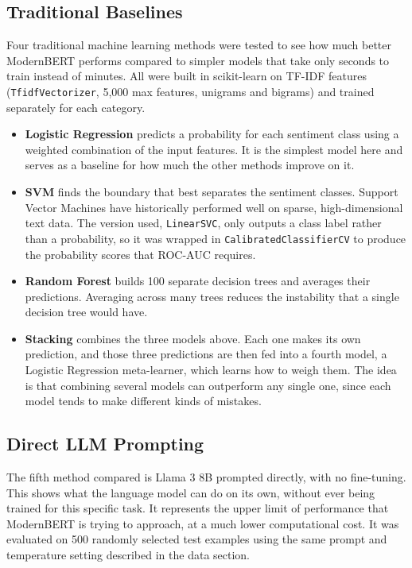 \documentclass[sigconf]{acmart}
\begin{document}
\subsection{Traditional Baselines}
Four traditional machine learning methods were tested to see how much better ModernBERT performs compared to simpler models that take only seconds to train instead of minutes. All were built in scikit-learn on TF-IDF features (\texttt{TfidfVectorizer}, 5,000 max features, unigrams and bigrams) and trained separately for each category.

\begin{itemize}
  \item \textbf{Logistic Regression} predicts a probability for each sentiment class using a weighted combination of the input features. It is the simplest model here and serves as a baseline for how much the other methods improve on it.
  \item \textbf{SVM} finds the boundary that best separates the sentiment classes. Support Vector Machines have historically performed well on sparse, high-dimensional text data. The version used, \texttt{LinearSVC}, only outputs a class label rather than a probability, so it was wrapped in \texttt{CalibratedClassifierCV} to produce the probability scores that ROC-AUC requires.
  \item \textbf{Random Forest} builds 100 separate decision trees and averages their predictions. Averaging across many trees reduces the instability that a single decision tree would have.
  \item \textbf{Stacking} combines the three models above. Each one makes its own prediction, and those three predictions are then fed into a fourth model, a Logistic Regression meta-learner, which learns how to weigh them. The idea is that combining several models can outperform any single one, since each model tends to make different kinds of mistakes.
\end{itemize}

\subsection{Direct LLM Prompting}
The fifth method compared is Llama 3 8B prompted directly, with no fine-tuning. This shows what the language model can do on its own, without ever being trained for this specific task. It represents the upper limit of performance that ModernBERT is trying to approach, at a much lower computational cost. It was evaluated on 500 randomly selected test examples using the same prompt and temperature setting described in the data section.
\end{document}
